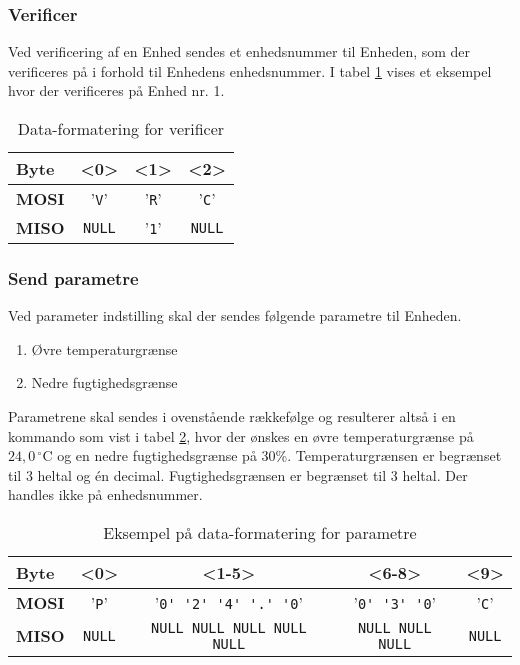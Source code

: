 \subsubsection{Verificer}

Ved verificering af en Enhed sendes et enhedsnummer til Enheden, som der verificeres på i forhold til Enhedens enhedsnummer. I tabel \ref{table:SWProtokol-verificer} vises et eksempel hvor der verificeres på Enhed nr. 1.

\begin{table}[H]
	\caption{Data-formatering for verificer}
	\centering
	\begin{tabular}{|l|c|c|c|}
		\hline 
		\textbf{Byte} & \textbf{<0>} & \textbf{<1>} & \textbf{<2>}   \\ 
		\hline 
		\textbf{MOSI} & '\verb+V+' & '\verb+R+' & '\verb+C+' \\ 
		\hline 
		\textbf{MISO} & \verb+NULL+ & '\verb+1+' & \verb+NULL+ \\ 
		\hline 
	\end{tabular} 
	\label{table:SWProtokol-verificer}
\end{table}

\subsubsection{Send parametre}

Ved parameter indstilling skal der sendes følgende parametre til Enheden.

\begin{enumerate}
	\item Øvre temperaturgrænse
	\item Nedre fugtighedsgrænse
\end{enumerate}

Parametrene skal sendes i ovenstående rækkefølge og resulterer altså i en kommando som vist i tabel \ref{table:SWProtokol-para}, hvor der ønskes en øvre temperaturgrænse på $24,0\,^{\circ}\mathrm{C}$ og en nedre fugtighedsgrænse på 30\%. Temperaturgrænsen er begrænset til 3 heltal og én decimal. Fugtighedsgrænsen er begrænset til 3 heltal. Der handles ikke på enhedsnummer.

\begin{table}[H]
	\caption{Eksempel på data-formatering for parametre}
	\centering
	\begin{tabular}{|l|c|c|c|c|}
		\hline 
		\textbf{Byte} & \textbf{<0>} & \textbf{<1-5>} & \textbf{<6-8>} & \textbf{<9>} \\ 
		\hline 
		\textbf{MOSI} & '\verb+P+' & '\verb+0' '2' '4' '.' '0+' & '\verb+0' '3' '0+' & '\verb+C+' \\ 
		\hline 
		\textbf{MISO} & \verb+NULL+ & \verb+NULL NULL NULL NULL NULL+ & \verb+NULL NULL NULL+ & \verb+NULL+\\ 
		\hline 
	\end{tabular} 
	\label{table:SWProtokol-para}
\end{table}

